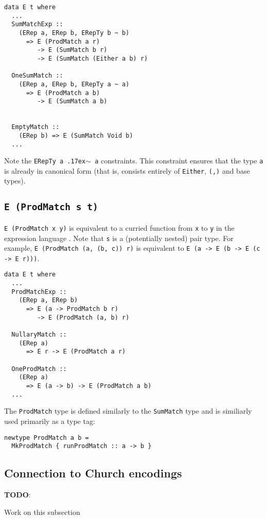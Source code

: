 \documentclass[sigplan,anonymous,review]{acmart}
\newcommand{\typeeq}{\raise.17ex\hbox{$\scriptstyle\mathtt{\sim}$}\,\;}
\newcommand{\ttt}{\texttt}
\newenvironment{todo}
  {\begin{tcolorbox}
   \textbf{TODO}:
  }
  {\end{tcolorbox}
  }
\begin{document}
\begin{lstlisting}
data E t where
  ...
  SumMatchExp ::
    (ERep a, ERep b, ERepTy b ~ b)
      => E (ProdMatch a r)
         -> E (SumMatch b r)
         -> E (SumMatch (Either a b) r)

  OneSumMatch ::
    (ERep a, ERep b, ERepTy a ~ a)
      => E (ProdMatch a b)
         -> E (SumMatch a b)


  EmptyMatch ::
    (ERep b) => E (SumMatch Void b)
  ...
\end{lstlisting}

Note the \ttt{ERepTy a \typeeq a} constraints. This constraint ensures that the type
\ttt{a} is already in canonical form (that is, consists entirely of
\ttt{Either}, \ttt{(,)} and base types).

\subsection{\ttt{E (ProdMatch s t)}}

\ttt{E (ProdMatch x y)} is equivalent to a curried function from \ttt{x} to
\ttt{y} in the expression language .  Note that \ttt{s} is a (potentially
nested) pair type. For example, \ttt{E (ProdMatch (a, (b, c)) r)} is
equivalent to \ttt{E (a -> E (b -> E (c -> E r)))}.

\begin{lstlisting}
data E t where
  ...
  ProdMatchExp ::
    (ERep a, ERep b)
      => E (a -> ProdMatch b r)
         -> E (ProdMatch (a, b) r)

  NullaryMatch ::
    (ERep a)
      => E r -> E (ProdMatch a r)

  OneProdMatch ::
    (ERep a)
      => E (a -> b) -> E (ProdMatch a b)
  ...
\end{lstlisting}

The \ttt{ProdMatch} type is defined similarly to the \ttt{SumMatch} type and is
similiarly used primarily as a type tag:

\begin{lstlisting}
newtype ProdMatch a b =
  MkProdMatch { runProdMatch :: a -> b }
\end{lstlisting}

\subsection{Connection to Church encodings}
\begin{todo}
  Work on this subsection
\end{todo}
\end{document}
